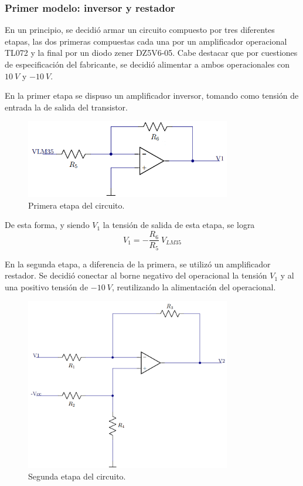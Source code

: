 \documentclass[a4paper]{article}
\begin{document}
\subsubsection{Primer modelo: inversor y restador}

En un principio, se decidió armar un circuito compuesto por tres diferentes etapas, las dos primeras compuestas cada una por un amplificador operacional TL072 y la final por un diodo zener DZ5V6-05. Cabe destacar que por cuestiones de especificación del fabricante, se decidió alimentar a ambos operacionales con $10 \ V$ y $-10 \ V$.

En la primer etapa se dispuso un amplificador inversor, tomando como tensión de entrada la de salida del transistor.

\begin{figure}[H]
	\centering
	\includegraphics[width=0.8\textwidth]{Ejercicio6/Imagenes/CircuitoEtapa1-M1.png}
\caption{Primera etapa del circuito.}
	\label{fig:cir1-M1}
\end{figure}

De esta forma, y siendo $V_1$ la tensión de salida de esta etapa, se logra
\[
	V_1 = -\frac{R_6}{R_5} \ V_{LM35}
\]

En la segunda etapa, a diferencia de la primera, se utilizó un amplificador restador. Se decidió conectar al borne negativo del operacional la tensión $V_1$ y al  una positivo tensión de $- 10 \ V$, reutilizando la alimentación del operacional.

\begin{figure}[H]
	\centering
	\includegraphics[width=0.8\textwidth]{Ejercicio6/Imagenes/CircuitoEtapa2-M1.png}
	\caption{Segunda etapa del circuito.}
	\label{fig:cir2-M1}
\end{figure}
\end{document}

